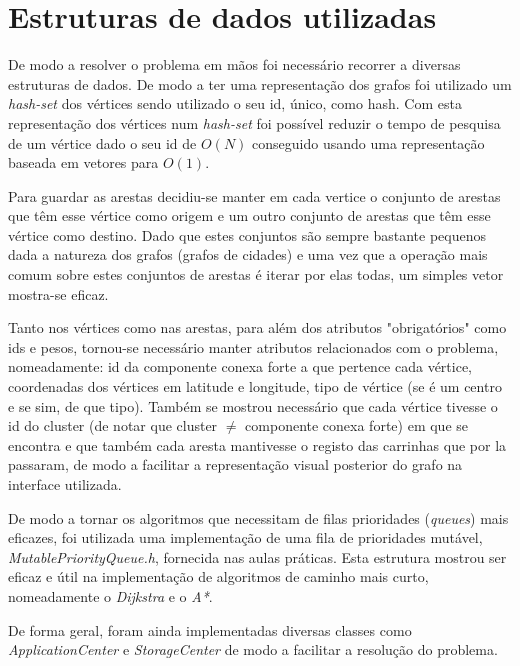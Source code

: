 \documentclass[12pt,a4paper]{report}
\begin{document}
\chapter{Estruturas de dados utilizadas}
De modo a resolver o problema em mãos foi necessário recorrer a diversas estruturas de dados. De modo a ter uma representação
dos grafos foi utilizado um \textit{hash-set} dos vértices sendo utilizado o seu id, único, como hash. Com esta representação
dos vértices num \textit{hash-set} foi possível reduzir o tempo de pesquisa de um vértice dado o seu id de \( O(N) \) conseguido
usando uma representação baseada em vetores para \( O(1) \). \par

Para guardar as arestas decidiu-se manter em cada vertice o conjunto de arestas que têm esse vértice como origem e um outro
conjunto de arestas que têm esse vértice como destino. Dado que estes conjuntos são sempre bastante pequenos dada a natureza
dos grafos (grafos de cidades) e uma vez que a operação mais comum sobre estes conjuntos de arestas é iterar por elas todas, 
um simples vetor mostra-se eficaz. \par

Tanto nos vértices como nas arestas, para além dos atributos "obrigatórios" como ids e pesos, tornou-se necessário manter 
atributos relacionados com o problema, nomeadamente: id da componente conexa forte a que pertence cada vértice, coordenadas dos
vértices em latitude e longitude, tipo de vértice (se é um centro e se sim, de que tipo). Também se mostrou necessário que 
cada vértice tivesse o id do cluster (de notar que cluster \( \neq \) componente conexa forte) em que se encontra e que também cada
aresta mantivesse o registo das carrinhas que por la passaram, de modo a facilitar a representação visual posterior do grafo na interface
utilizada. \par

De modo a tornar os algoritmos que necessitam de filas prioridades (\textit{queues}) mais eficazes, foi utilizada uma implementação
de uma fila de prioridades mutável, \textit{MutablePriorityQueue.h}, fornecida nas aulas práticas. Esta estrutura mostrou
ser eficaz e útil na implementação de algoritmos de caminho mais curto, nomeadamente o \textit{Dijkstra} e o \textit{A*}. \par

De forma geral, foram ainda implementadas diversas classes como \textit{ApplicationCenter} e \textit{StorageCenter} de modo a facilitar
a resolução do problema. \par
\end{document}
